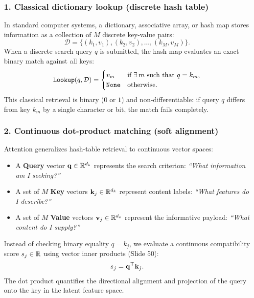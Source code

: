 \documentclass[../../../main.tex]{subfiles}
\begin{document}
\subsubsection{1. Classical dictionary lookup (discrete hash table)}
In standard computer systems, a dictionary, associative array, or hash map stores information as a collection of $M$ discrete key-value pairs:
\begin{equation}
\label{eq:discrete_dict_def}
\mathcal{D} = \{ (k_1, v_1), (k_2, v_2), \dots, (k_M, v_M) \}.
\end{equation}
When a discrete search query $q$ is submitted, the hash map evaluates an exact binary match against all keys:
\begin{equation}
\label{eq:discrete_lookup_op}
\text{\texttt{Lookup}}(q, \mathcal{D}) = \begin{cases}
v_m & \text{if } \exists\, m \text{ such that } q = k_m, \\
\text{\texttt{None}} & \text{otherwise}.
\end{cases}
\end{equation}
This classical retrieval is binary ($0$ or $1$) and non-differentiable: if query $q$ differs from key $k_m$ by a single character or bit, the match fails completely.

\subsubsection{2. Continuous dot-product matching (soft alignment)}
Attention generalizes hash-table retrieval to continuous vector spaces:
\begin{itemize}
    \item A \textbf{Query} vector $\mathbf{q} \in \mathbb{R}^{d_k}$ represents the search criterion: \emph{``What information am I seeking?''}
    \item A set of $M$ \textbf{Key} vectors $\mathbf{k}_j \in \mathbb{R}^{d_k}$ represent content labels: \emph{``What features do I describe?''}
    \item A set of $M$ \textbf{Value} vectors $\mathbf{v}_j \in \mathbb{R}^{d_v}$ represent the informative payload: \emph{``What content do I supply?''}
\end{itemize}
Instead of checking binary equality $q = k_j$, we evaluate a continuous compatibility score $s_j \in \mathbb{R}$ using vector inner products (Slide 50):
\begin{equation}
\label{eq:raw_dot_product_score}
s_j = \mathbf{q}^\top \mathbf{k}_j.
\end{equation}
The dot product quantifies the directional alignment and projection of the query onto the key in the latent feature space.
\end{document}
